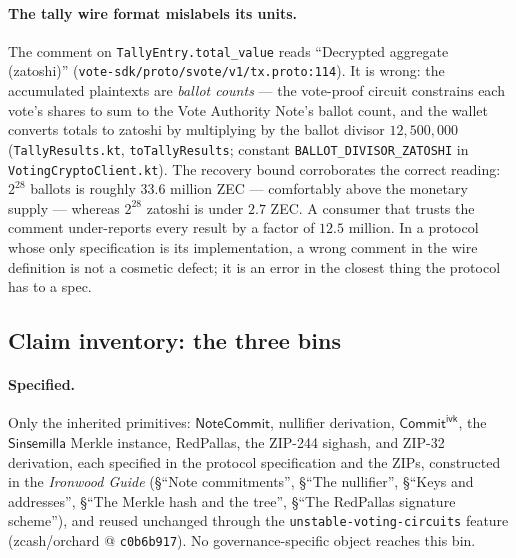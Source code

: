 \documentclass[11pt,a4paper]{article}
\theoremstyle{definition}
\newcommand{\NoteCommit}{\ensuremath{\mathsf{NoteCommit}}}
\newcommand{\Sinsemilla}{\ensuremath{\mathsf{Sinsemilla}}}
\newcommand{\CommitIvk}{\ensuremath{\mathsf{Commit}^{\mathsf{ivk}}}}
\begin{document}
\paragraph{The tally wire format mislabels its units.} The comment on
\texttt{TallyEntry.total\_value} reads ``Decrypted aggregate (zatoshi)''
(\texttt{vote-sdk/proto/svote/v1/tx.proto:114}). It is wrong: the
accumulated plaintexts are \emph{ballot counts} --- the vote-proof circuit
constrains each vote's shares to sum to the Vote Authority Note's ballot
count, and the wallet converts totals to zatoshi by multiplying by the
ballot divisor $12{,}500{,}000$ (\texttt{TallyResults.kt},
\texttt{toTallyResults}; constant \texttt{BALLOT\_DIVISOR\_ZATOSHI} in
\texttt{VotingCryptoClient.kt}). The recovery bound corroborates the
correct reading: $2^{28}$ ballots is roughly $33.6$ million ZEC ---
comfortably above the monetary supply --- whereas $2^{28}$ zatoshi is
under $2.7$ ZEC. A consumer that trusts the comment under-reports every
result by a factor of $12.5$ million. In a protocol whose only
specification is its implementation, a wrong comment in the wire
definition is not a cosmetic defect; it is an error in the closest thing
the protocol has to a spec.

\subsection{Claim inventory: the three bins}\label{sec:vote-inventory}

\paragraph{Specified.} Only the inherited primitives: \NoteCommit{},
nullifier derivation, \CommitIvk{}, the \Sinsemilla{} Merkle instance,
RedPallas, the ZIP-244 sighash, and ZIP-32 derivation, each specified in
the protocol specification and the ZIPs, constructed in the \emph{Ironwood
Guide} (\S``Note commitments'', \S``The nullifier'', \S``Keys and
addresses'', \S``The Merkle hash and the tree'', \S``The RedPallas signature
scheme''), and reused unchanged through the
\texttt{unstable-voting-circuits} feature (zcash/orchard @
\texttt{c0b6b917}). No governance-specific object reaches this bin.
\end{document}

